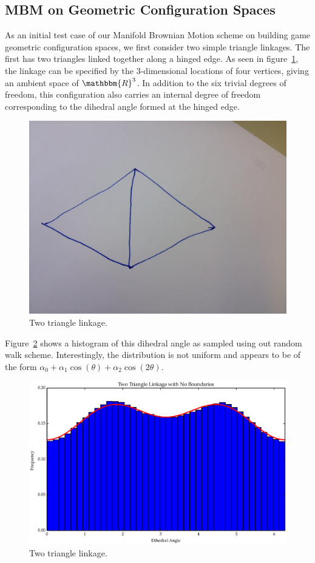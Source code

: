 
\subsection{MBM on Geometric Configuration Spaces}
\label{ssc:MBMGCS}
As an initial test case of our Manifold Brownian Motion scheme on building game geometric configuration spaces, we first consider two simple triangle linkages. The first has two triangles linked together along a hinged edge. As seen in figure~\ref{fig:T2_diagram}, the linkage can be specified by the $3$-dimensional locations of four vertices, giving an ambient space of $\mathbbm{R}^3$. In addition to the six trivial degrees of freedom, this configuration also carries an internal degree of freedom corresponding to the dihedral angle formed at the hinged edge. 
\begin{figure}[ht]
\centering
  \includegraphics[scale=0.2]{images/T2_diagram.eps}
\caption{Two triangle linkage.}
\label{fig:T2_diagram}
\end{figure}
Figure~\ref{fig:T2_1} shows a histogram of this dihedral angle as sampled using out random walk scheme. Interestingly, the distribution is not uniform and appears to be of the form $\alpha_0 + \alpha_1\cos(\theta) + \alpha_2\cos(2\theta)$. 
\begin{figure}[ht]
\centering
  \includegraphics[scale=0.6]{images/T2_1.eps}
\caption{Two triangle linkage.}
\label{fig:T2_1}
\end{figure}

